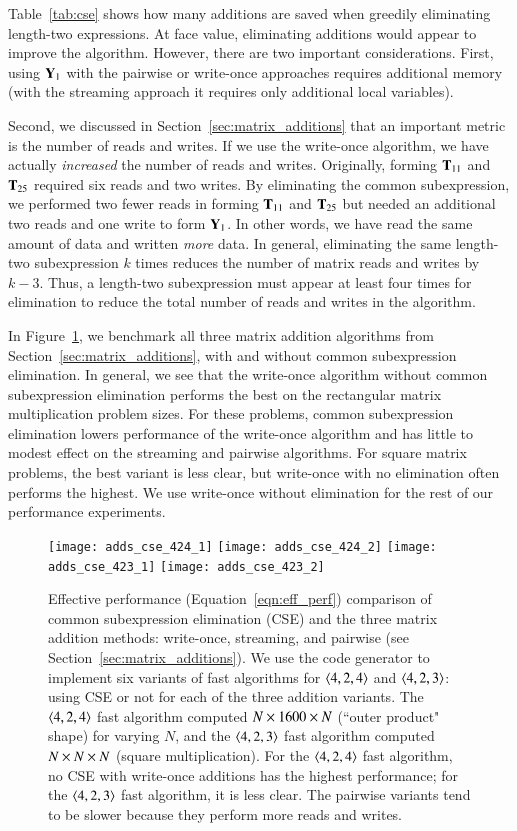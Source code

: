\documentclass[preprint]{sigplanconf}
\newcommand{\M}[2][]{{\bm{#1\mathbf{\MakeUppercase{#2}}}}}
\begin{document}
Table~\ref{tab:cse} shows how many additions are saved when greedily eliminating length-two expressions.
At face value, eliminating additions would appear to improve the algorithm.
However, there are two important considerations.
First, using $\M{Y}_1$ with the pairwise or write-once approaches requires additional memory (with the streaming approach it requires only additional local variables).

Second, we discussed in Section~\ref{sec:matrix_additions} that an important metric
is the number of reads and writes.
If we use the write-once algorithm, we have actually \emph{increased} the number of reads and writes.
Originally, forming $\M{T}_{11}$ and $\M{T}_{25}$ required six reads and two writes.
By eliminating the common subexpression, we performed two fewer reads in forming $\M{T}_{11}$ and $\M{T}_{25}$ but needed
an additional two reads and one write to form $\M{Y}_1$.
In other words, we have read the same amount of data and written \emph{more} data.
In general, eliminating the same length-two subexpression $k$ times reduces the number of matrix reads and writes by $k - 3$.
Thus, a length-two subexpression must appear at least four times for elimination to reduce the total number of reads and writes in the algorithm.

In Figure~\ref{fig:adds_cse}, we benchmark all three matrix addition algorithms from Section~\ref{sec:matrix_additions}, with and without common subexpression elimination.
In general, we see that the write-once algorithm without common subexpression elimination performs the best on the rectangular matrix multiplication problem sizes.
For these problems, common subexpression elimination lowers performance of the write-once algorithm and has little to modest effect on the streaming and pairwise algorithms.
For square matrix problems, the best variant is less clear, but write-once with no elimination often performs the highest.
We use write-once without elimination for the rest of our performance experiments.


\begin{figure*}[tb]
\centering
\texttt{[image: adds\_cse\_424\_1]}
\texttt{[image: adds\_cse\_424\_2]}
\texttt{[image: adds\_cse\_423\_1]}
\texttt{[image: adds\_cse\_423\_2]}
\caption{
Effective performance (Equation~\eqref{eqn:eff_perf}) comparison of common subexpression elimination (CSE) and the three matrix addition methods: write-once, streaming, and pairwise (see Section~\ref{sec:matrix_additions}).
We use the code generator to implement six variants of fast algorithms for $\left\langle4, 2, 4\right\rangle$ and $\left\langle4, 2, 3\right\rangle$: using CSE or not for each of the three addition variants.
The $\left\langle4, 2, 4\right\rangle$ fast algorithm computed $N \times 1600 \times N$ (``outer product" shape) for varying $N$,
and the $\left\langle4, 2, 3\right\rangle$ fast algorithm computed $N \times N \times N$ (square multiplication).
For the $\left\langle4, 2, 4\right\rangle$ fast algorithm, no CSE with write-once additions has the highest performance;
for the $\left\langle4, 2, 3\right\rangle$ fast algorithm, it is less clear.
The pairwise variants tend to be slower because they perform more reads and writes.
}
\label{fig:adds_cse}
\end{figure*}
\end{document}
